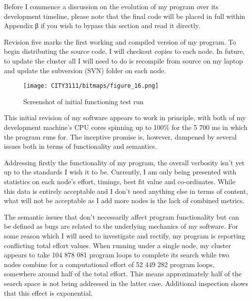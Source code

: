 \textbf{}

Before I commence a discussion on the evolution of my program over its development timeline, please note that the final code will be placed in full within Appendix β if you wish to bypass this section and read it directly.

Revision five marks the first working and compiled version of my program. To begin distributing the source code, I will checkout copies to each node. In future, to update the cluster all I will need to do is recompile from source on my laptop and update the subversion (SVN) folder on each node.

\begin{figure}[H]
    \texttt{[image: CITY3111/bitmaps/figure\_16.png]}
    \caption{Screenshot of initial functioning test run}
    \label{figure_16}
\end{figure}

This initial revision of my software appears to work in principle, with both of my development machine's CPU cores spinning up to 100\% for the 5 700 ms in which the program runs for. The inceptive promise is, however, dampened by several issues both in terms of functionality and semantics.

Addressing firstly the functionality of my program, the overall verbosity isn't yet up to the standards I wish it to be. Currently, I am only being presented with statistics on each node's effort, timings, best fit value and co-ordinates. While this data is entirely acceptable and I don't need anything else in terms of content, what will not be acceptable as I add more nodes is the lack of combined metrics.

The semantic issues that don't necessarily affect program functionality but can be defined as bugs are related to the underlying mechanics of my software. For some reason which I will need to investigate and rectify, my program is reporting conflicting total effort values. When running under a single node, my cluster appears to take 104 878 081 program loops to complete its search while two nodes combine for a computational effort of 52 449 282 program loops, somewhere around half of the total effort. This means approximately half of the search space is not being addressed in the latter case. Additional inspection shows that this effect is exponential.

\textbf{}

